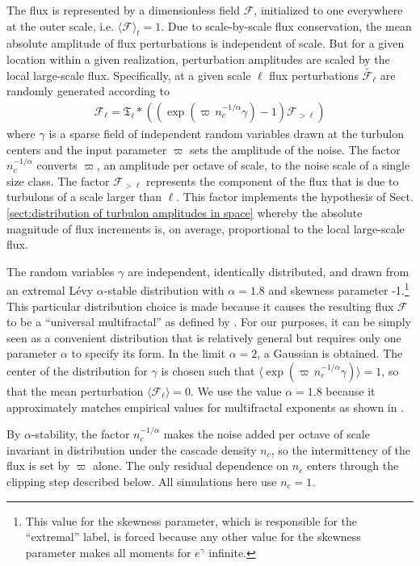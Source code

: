 \documentclass[acp, manuscript, english]{copernicus}
\begin{document}
The flux is represented by a dimensionless field $\mathcal{F}$, initialized to one everywhere at the outer scale, i.e. $\langle \mathcal{F}\rangle_t=1$. Due to scale-by-scale flux conservation, the mean absolute amplitude of flux perturbations is independent of scale. But for a given location within a given realization, perturbation amplitudes are scaled by the local large-scale flux. Specifically, at a given scale $\ell$ flux perturbations $\widetilde{\mathcal{F}_{\ell}}$ are randomly generated according to 
\begin{align}
  \mathcal{F}_{\ell} = \mathfrak{T}_{\ell} * \left(\left(\exp\left(\varpi\, n_c^{-1/\alpha}\gamma\right) - 1\right)\mathcal{F}_{>\ell}\right) \label{eq:flux at scale}
\end{align}
where $\gamma$ is a sparse field of independent random variables drawn at the turbulon centers and the input parameter $\varpi$ sets the amplitude of the noise. The factor $n_c^{-1/\alpha}$ converts $\varpi$, an amplitude per octave of scale, to the noise scale of a single size class. The factor $\mathcal{F}_{>\ell}$ represents the component of the flux that is due to turbulons of a scale larger than $\ell$. This factor implements the hypothesis of Sect. \ref{sect:distribution of turbulon amplitudes in space} whereby the absolute magnitude of flux increments is, on average, proportional to the local large-scale flux. 

The random variables $\gamma$ are independent, identically distributed, and drawn from an extremal L\'evy $\alpha$-stable distribution with $\alpha = 1.8$ and skewness parameter -1.\footnote{This value for the skewness parameter, which is responsible for the ``extremal'' label, is forced because any other value for the skewness parameter makes all moments for $e^\gamma$ infinite.} This particular distribution choice is made because it causes the resulting flux $\mathcal{F}$ to be a ``universal multifractal'' as defined by \citet{lovejoy2013}. For our purposes, it can be simply seen as a convenient distribution that is relatively general but requires only one parameter $\alpha$ to specify its form. In the limit $\alpha=2$, a Gaussian is obtained. The center of the distribution for $\gamma$ is chosen such that $\langle \exp(\varpi\, n_c^{-1/\alpha}\gamma)\rangle = 1$, so that the mean perturbation $\langle \mathcal{F}_\ell\rangle=0$. We use the value $\alpha=1.8$ because it approximately matches empirical values for multifractal exponents as shown in \citet{lovejoy2013}. 

By $\alpha$-stability, the factor $n_c^{-1/\alpha}$ makes the noise added per octave of scale invariant in distribution under the cascade density $n_c$, so the intermittency of the flux is set by $\varpi$ alone. The only residual dependence on $n_c$ enters through the clipping step described below. All simulations here use $n_c=1$.
\end{document}
